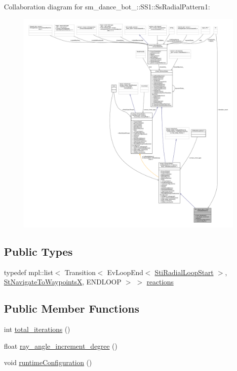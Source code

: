 Collaboration diagram for sm\+\_\+dance\+\_\+bot\+\_\+:\+:S\+S1\+:\+:Ss\+Radial\+Pattern1\+:
\nopagebreak
\begin{figure}[H]
\begin{center}
\leavevmode
\includegraphics[width=350pt]{structsm__dance__bot__2_1_1SS1_1_1SsRadialPattern1__coll__graph}
\end{center}
\end{figure}
\subsection*{Public Types}
\begin{DoxyCompactItemize}
\item 
typedef mpl\+::list$<$ Transition$<$ Ev\+Loop\+End$<$ \hyperlink{structsm__dance__bot__2_1_1radial__motion__states_1_1StiRadialLoopStart}{Sti\+Radial\+Loop\+Start} $>$, \hyperlink{structsm__dance__bot__2_1_1StNavigateToWaypointsX}{St\+Navigate\+To\+WaypointsX}, E\+N\+D\+L\+O\+OP $>$ $>$ \hyperlink{structsm__dance__bot__2_1_1SS1_1_1SsRadialPattern1_ac3147241844d2bd0342377c218ba8362}{reactions}
\end{DoxyCompactItemize}
\subsection*{Public Member Functions}
\begin{DoxyCompactItemize}
\item 
int \hyperlink{structsm__dance__bot__2_1_1SS1_1_1SsRadialPattern1_a14abf04c65ee07d9f4bdc354ed5a23fd}{total\+\_\+iterations} ()
\item 
float \hyperlink{structsm__dance__bot__2_1_1SS1_1_1SsRadialPattern1_aa3c4def707a1731ae0c0527c97c1a3e1}{ray\+\_\+angle\+\_\+increment\+\_\+degree} ()
\item 
void \hyperlink{structsm__dance__bot__2_1_1SS1_1_1SsRadialPattern1_a356a27cca6c8994661f794584c44d04d}{runtime\+Configuration} ()
\end{DoxyCompactItemize}
